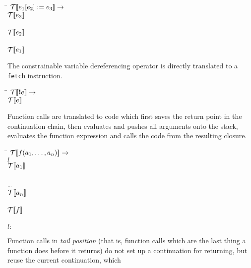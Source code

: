 \begin{tabbing}
\qquad \= \quad \kill
${\mathcal{T}{\normalfont [\![} e_1[e_2] := e_3 {\normalfont ]\!]}} \rightarrow$\\
\>${\mathcal{T}{\normalfont [\![} e_3 {\normalfont ]\!]}}$\\
\\
\>${\mathcal{T}{\normalfont [\![} e_2 {\normalfont ]\!]}}$\\
\\
\>${\mathcal{T}{\normalfont [\![} e_1 {\normalfont ]\!]}}$\\
\end{tabbing}
%
The constrainable variable dereferencing operator is directly
translated to a {\tt fetch} instruction.
%
\begin{tabbing}
\qquad \= \quad \kill
${\mathcal{T}{\normalfont [\![} \text{\bf !} e {\normalfont ]\!]}} \rightarrow$\\
\>${\mathcal{T}{\normalfont [\![} e {\normalfont ]\!]}}$\\
\end{tabbing}
%
Function calls are translated to code which first saves the return
point in the continuation chain, then evaluates and pushes all
arguments onto the stack, evaluates the function expression and calls
the code from the resulting closure.
%
\begin{tabbing}
\qquad \= \quad \kill
${\mathcal{T}{\normalfont [\![} f(a_1,\dots,a_n) {\normalfont ]\!]}} \rightarrow$\\
 $l$\\
\>${\mathcal{T}{\normalfont [\![} a_1 {\normalfont ]\!]}}$\\
\\
\>\dots{}\\
\>${\mathcal{T}{\normalfont [\![} a_n {\normalfont ]\!]}}$\\
\\
\>${\mathcal{T}{\normalfont [\![} f {\normalfont ]\!]}}$\\
\\
$l:$
\end{tabbing}
%
Function calls in {\em tail position} (that is, function calls which
are the last thing a function does before it returns) do not set up a
continuation for returning, but reuse the current continuation, which

